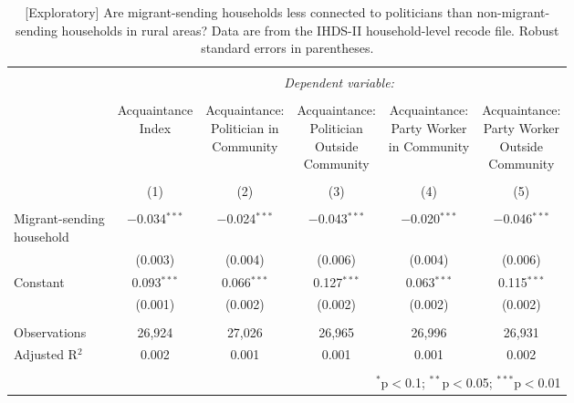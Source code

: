 \documentclass[
  11.5pt,
]{article}
\begin{document}
\begin{table}[!htbp] \centering 
  \caption{[Exploratory] Are migrant-sending households less connected to politicians than non-migrant-sending households in rural areas? Data are from the IHDS-II household-level recode file. Robust standard errors in parentheses.} 
  \label{tab:ihds2_acquaintance_rural} 
\fontsize{10pt}{10pt}\selectfont
\begin{tabular}{@{\extracolsep{5pt}}lccccc} 
\\[-1.8ex]\hline 
\hline \\[-1.8ex] 
 & \multicolumn{5}{c}{\textit{Dependent variable:}} \\ 
\cline{2-6} 
\\[-1.8ex] & \shortstack{Acquaintance \\ Index} & \shortstack{Acquaintance: \\ Politician in \\ Community} & \shortstack{Acquaintance: \\ Politician \\ Outside \\ Community} & \shortstack{Acquaintance: \\ Party Worker \\ in Community} & \shortstack{Acquaintance: \\ Party Worker \\ Outside \\ Community} \\ 
\\[-1.8ex] & (1) & (2) & (3) & (4) & (5)\\ 
\hline \\[-1.8ex] 
 \shortstack{Migrant-sending \\ household} & $-$0.034$^{***}$ & $-$0.024$^{***}$ & $-$0.043$^{***}$ & $-$0.020$^{***}$ & $-$0.046$^{***}$ \\ 
  & (0.003) & (0.004) & (0.006) & (0.004) & (0.006) \\ 
  Constant & 0.093$^{***}$ & 0.066$^{***}$ & 0.127$^{***}$ & 0.063$^{***}$ & 0.115$^{***}$ \\ 
  & (0.001) & (0.002) & (0.002) & (0.002) & (0.002) \\ 
 \hline \\[-1.8ex] 
Observations & 26,924 & 27,026 & 26,965 & 26,996 & 26,931 \\ 
Adjusted R$^{2}$ & 0.002 & 0.001 & 0.001 & 0.001 & 0.002 \\ 
\hline 
\hline \\[-1.8ex] 
\multicolumn{6}{r}{$^{*}$p$<$0.1; $^{**}$p$<$0.05; $^{***}$p$<$0.01} \\ 
\end{tabular} 
\end{table}
\end{document}
